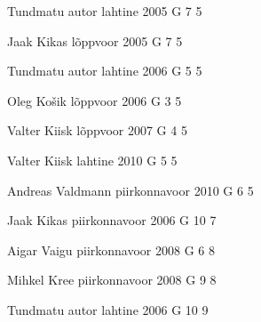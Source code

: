 \documentclass[11pt]{article}
\begin{document}
{Tundmatu autor} %
{lahtine} %
{2005} %
{G 7} %
{5} %
{

\ifEngHint
\fi
}

{Jaak Kikas} %
{lõppvoor} %
{2005} %
{G 7} %
{5} %
{

\ifEngHint
\fi
}

{Tundmatu autor} %
{lahtine} %
{2006} %
{G 5} %
{5} %
{

\ifEngHint
\fi
}

{Oleg Košik} %
{lõppvoor} %
{2006} %
{G 3} %
{5} %
{

\ifEngHint
\fi
}

{Valter Kiisk} %
{lõppvoor} %
{2007} %
{G 4} %
{5} %
{

\ifEngHint
\fi
}

{Valter Kiisk} %
{lahtine} %
{2010} %
{G 5} %
{5} %
{

\ifEngHint
\fi
}

{Andreas Valdmann} %
{piirkonnavoor} %
{2010} %
{G 6} %
{5} %
{

\ifEngHint
\fi
}

{Jaak Kikas} %
{piirkonnavoor} %
{2006} %
{G 10} %
{7} %
{

\ifEngHint
\fi
}

{Aigar Vaigu} %
{piirkonnavoor} %
{2008} %
{G 6} %
{8} %
{

\ifEngHint
\fi
}

{Mihkel Kree} %
{piirkonnavoor} %
{2008} %
{G 9} %
{8} %
{

\ifEngHint
\fi
}

{Tundmatu autor} %
{lahtine} %
{2006} %
{G 10} %
{9} %
{

\ifEngHint
\fi
}
\end{document}
